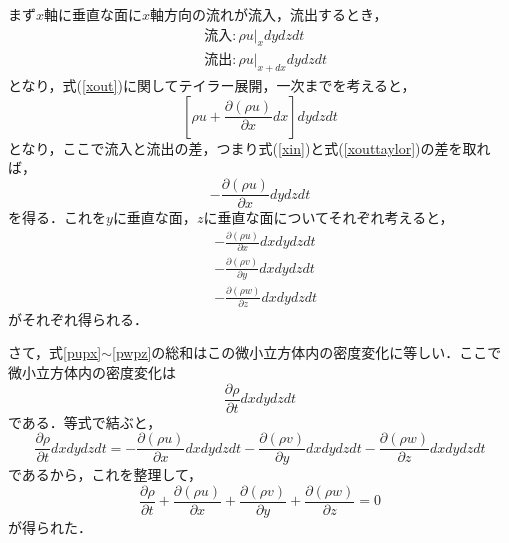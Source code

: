 \documentclass{jsarticle}
\newcommand{\pfrac}[2]{\frac{\partial{}{#1}}{\partial{}{#2}}}
\begin{document}
まず$x$軸に垂直な面に$x$軸方向の流れが流入，流出するとき，
\begin{align}
  &流入:\rho{}u|_{x}dydzdt\label{xin}\\
  &流出:\rho{}u|_{x+dx}dydzdt\label{xout}
\end{align}
となり，式(\ref{xout})に関してテイラー展開，一次までを考えると，
\begin{equation}
  \left[\rho{}u+\pfrac{(\rho{}u)}{x}dx\right]dydzdt\label{xouttaylor}
\end{equation}
となり，ここで流入と流出の差，つまり式(\ref{xin})と式(\ref{xouttaylor})の差を取れば，
\begin{equation}
  -\pfrac{(\rho{}u)}{x}dydzdt
\end{equation}
を得る．これを$y$に垂直な面，$z$に垂直な面についてそれぞれ考えると，
\begin{align}
  &-\pfrac{(\rho{}u)}{x}dxdydzdt\label{pupx}\\
  &-\pfrac{(\rho{}v)}{y}dxdydzdt\label{pvpy}\\
  &-\pfrac{(\rho{}w)}{z}dxdydzdt\label{pwpz}
\end{align}
がそれぞれ得られる．

さて，式\ref{pupx}$\sim$\ref{pwpz}の総和はこの微小立方体内の密度変化に等しい．ここで微小立方体内の密度変化は
\begin{equation}
  \pfrac{\rho}{t}dxdydzdt
\end{equation}
である．等式で結ぶと，
\begin{equation}
  \pfrac{\rho}{t}dxdydzdt=-\pfrac{(\rho{}u)}{x}dxdydzdt-\pfrac{(\rho{}v)}{y}dxdydzdt-\pfrac{(\rho{}w)}{z}dxdydzdt
\end{equation}
であるから，これを整理して，
\begin{equation}
  \pfrac{\rho}{t}+\pfrac{(\rho{}u)}{x}+\pfrac{(\rho{}v)}{y}+\pfrac{(\rho{}w)}{z}=0
\end{equation}
が得られた．
\end{document}
